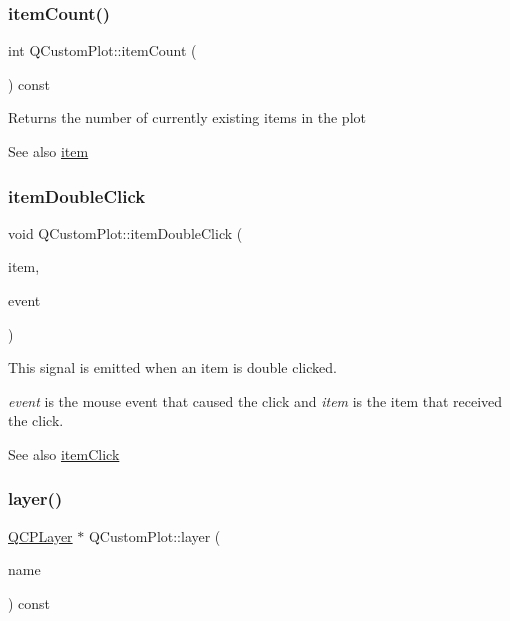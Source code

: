 \subsubsection{\texorpdfstring{item\+Count()}{itemCount()}}
{\footnotesize\ttfamily int Q\+Custom\+Plot\+::item\+Count (\begin{DoxyParamCaption}{ }\end{DoxyParamCaption}) const}

Returns the number of currently existing items in the plot

\begin{DoxySeeAlso}{See also}
\hyperlink{class_q_custom_plot_ac042f2e78edd228ccf2f26b7fe215239}{item} 
\end{DoxySeeAlso}
\mbox{\label{class_q_custom_plot_ac83aa9f5a3e9bb3efc9cdc763dcd42a6}} 
\subsubsection{\texorpdfstring{item\+Double\+Click}{itemDoubleClick}}
{\footnotesize\ttfamily void Q\+Custom\+Plot\+::item\+Double\+Click (\begin{DoxyParamCaption}\item[{\hyperlink{class_q_c_p_abstract_item}{Q\+C\+P\+Abstract\+Item} $\ast$}]{item,  }\item[{Q\+Mouse\+Event $\ast$}]{event }\end{DoxyParamCaption})\hspace{0.3cm}{\ttfamily [signal]}}

This signal is emitted when an item is double clicked.

{\itshape event} is the mouse event that caused the click and {\itshape item} is the item that received the click.

\begin{DoxySeeAlso}{See also}
\hyperlink{class_q_custom_plot_ae16b51f52d2b7aebbc7e3e74e6ff2e4b}{item\+Click} 
\end{DoxySeeAlso}
\mbox{\label{class_q_custom_plot_a0a96244e7773b242ef23c32b7bdfb159}} 
\subsubsection{\texorpdfstring{layer()}{layer()}\hspace{0.1cm}{\footnotesize\ttfamily [1/2]}}
{\footnotesize\ttfamily \hyperlink{class_q_c_p_layer}{Q\+C\+P\+Layer} $\ast$ Q\+Custom\+Plot\+::layer (\begin{DoxyParamCaption}\item[{const Q\+String \&}]{name }\end{DoxyParamCaption}) const}

